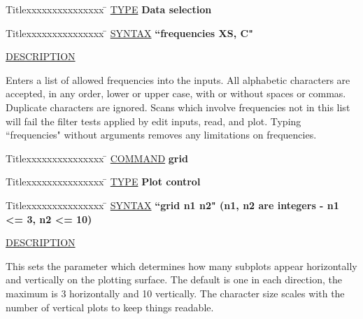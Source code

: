 \begin{tabbing}
Titlexxxxxxxxxxxxxxx \= \kill
\underline{TYPE} \> {\bf 		Data selection} \\
\end{tabbing}

\begin{tabbing}
Titlexxxxxxxxxxxxxxx \= \kill
\underline{SYNTAX} \> {\bf 		``frequencies XS, C"} \\
\end{tabbing}

\underline{DESCRIPTION}
\begin{list}{}{\setlength{\leftmargin}{0.5in}
     \setlength{\rightmargin}{0in}}
\item
Enters a list of allowed frequencies into the inputs.  All alphabetic
characters are accepted, in any order, lower or upper case, with or
without spaces or commas.  Duplicate characters are ignored.  Scans
which involve frequencies not in this list will fail the filter tests
applied by edit inputs, read, and plot.  Typing ``frequencies" without
arguments removes any limitations on frequencies.
\end{list}
\vspace{.2in}

\begin{tabbing}
Titlexxxxxxxxxxxxxxx \= \kill
\underline{COMMAND} \> {\bf 	grid} \\
\end{tabbing}

\begin{tabbing}
Titlexxxxxxxxxxxxxxx \= \kill
\underline{TYPE} \> {\bf 		Plot control} \\
\end{tabbing}

\begin{tabbing}
Titlexxxxxxxxxxxxxxx \= \kill
\underline{SYNTAX} \> {\bf 		``grid n1 n2" (n1, n2 are integers - n1 <= 3, n2 <= 10)} \\
\end{tabbing}

\underline{DESCRIPTION}
\begin{list}{}{\setlength{\leftmargin}{0.5in}
     \setlength{\rightmargin}{0in}}
\item
This sets the parameter which determines how many subplots
appear horizontally and vertically on the plotting surface.
The default is one in each direction, the maximum is 3
horizontally and 10 vertically.  The character size scales
with the number of vertical plots to keep things readable.
\end{list}
\vspace{.2in}

